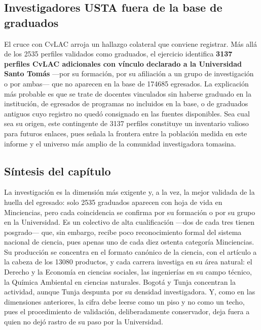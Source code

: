\subsection{Investigadores USTA fuera de la base de graduados}
El cruce con CvLAC arroja un hallazgo colateral que conviene registrar. Más allá de los \num{2535} perfiles validados como graduados, el ejercicio identifica \textbf{\num{3137} perfiles CvLAC adicionales con vínculo declarado a la Universidad Santo Tomás} ---por su formación, por su afiliación a un grupo de investigación o por ambas--- que no aparecen en la base de \num{174685} egresados. La explicación más probable es que se trate de docentes vinculados sin haberse graduado en la institución, de egresados de programas no incluidos en la base, o de graduados antiguos cuyo registro no quedó consignado en las fuentes disponibles. Sea cual sea su origen, este contingente de \num{3137} perfiles constituye un inventario valioso para futuros enlaces, pues señala la frontera entre la población medida en este informe y el universo más amplio de la comunidad investigadora tomasina.

\subsection{Síntesis del capítulo}
\begin{cajahallazgo}
La investigación es la dimensión más exigente y, a la vez, la mejor validada de la huella del egresado: solo \num{2535} graduados aparecen con hoja de vida en Minciencias, pero cada coincidencia se confirma por su formación o por su grupo en la Universidad. Es un colectivo de alta cualificación ---dos de cada tres tienen posgrado--- que, sin embargo, recibe poco reconocimiento formal del sistema nacional de ciencia, pues apenas uno de cada diez ostenta categoría Minciencias. Su producción se concentra en el formato canónico de la ciencia, con el artículo a la cabeza de los \num{13080} productos, y cada carrera investiga en su área natural: el Derecho y la Economía en ciencias sociales, las ingenierías en su campo técnico, la Química Ambiental en ciencias naturales. Bogotá y Tunja concentran la actividad, aunque Tunja despunta por su densidad investigadora. Y, como en las dimensiones anteriores, la cifra debe leerse como un piso y no como un techo, pues el procedimiento de validación, deliberadamente conservador, deja fuera a quien no dejó rastro de su paso por la Universidad.
\end{cajahallazgo}
